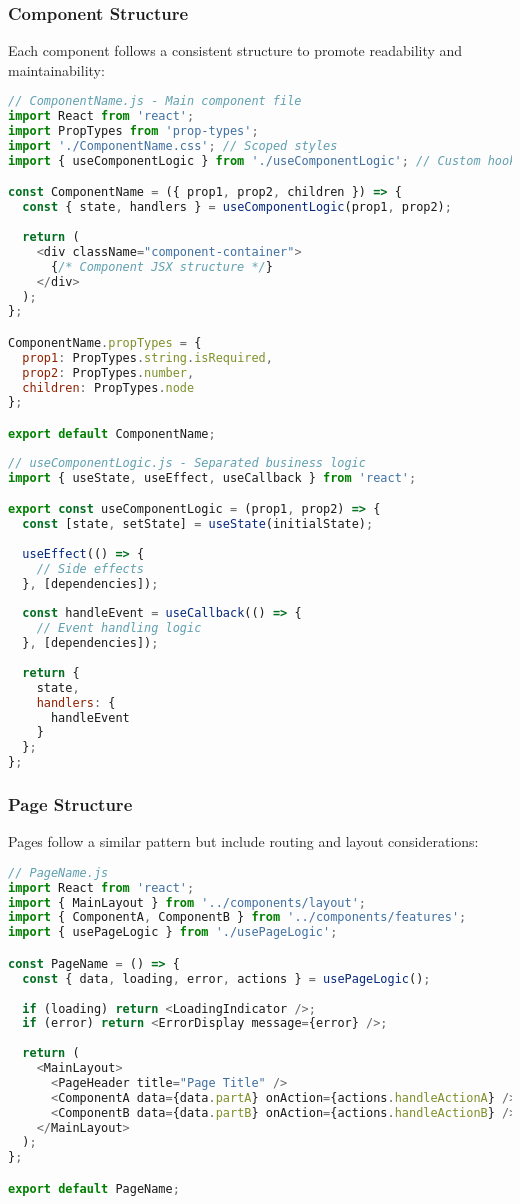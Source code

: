 \documentclass[12pt,a4paper]{article}
\begin{document}
\subsubsection{Component Structure}
Each component follows a consistent structure to promote readability and maintainability:

\begin{lstlisting}[language=JavaScript]
// ComponentName.js - Main component file
import React from 'react';
import PropTypes from 'prop-types';
import './ComponentName.css'; // Scoped styles
import { useComponentLogic } from './useComponentLogic'; // Custom hook

const ComponentName = ({ prop1, prop2, children }) => {
  const { state, handlers } = useComponentLogic(prop1, prop2);
  
  return (
    <div className="component-container">
      {/* Component JSX structure */}
    </div>
  );
};

ComponentName.propTypes = {
  prop1: PropTypes.string.isRequired,
  prop2: PropTypes.number,
  children: PropTypes.node
};

export default ComponentName;
\end{lstlisting}

\begin{lstlisting}[language=JavaScript]
// useComponentLogic.js - Separated business logic
import { useState, useEffect, useCallback } from 'react';

export const useComponentLogic = (prop1, prop2) => {
  const [state, setState] = useState(initialState);
  
  useEffect(() => {
    // Side effects
  }, [dependencies]);
  
  const handleEvent = useCallback(() => {
    // Event handling logic
  }, [dependencies]);
  
  return {
    state,
    handlers: {
      handleEvent
    }
  };
};
\end{lstlisting}

\subsubsection{Page Structure}
Pages follow a similar pattern but include routing and layout considerations:

\begin{lstlisting}[language=JavaScript]
// PageName.js
import React from 'react';
import { MainLayout } from '../components/layout';
import { ComponentA, ComponentB } from '../components/features';
import { usePageLogic } from './usePageLogic';

const PageName = () => {
  const { data, loading, error, actions } = usePageLogic();
  
  if (loading) return <LoadingIndicator />;
  if (error) return <ErrorDisplay message={error} />;
  
  return (
    <MainLayout>
      <PageHeader title="Page Title" />
      <ComponentA data={data.partA} onAction={actions.handleActionA} />
      <ComponentB data={data.partB} onAction={actions.handleActionB} />
    </MainLayout>
  );
};

export default PageName;
\end{lstlisting}
\end{document}
